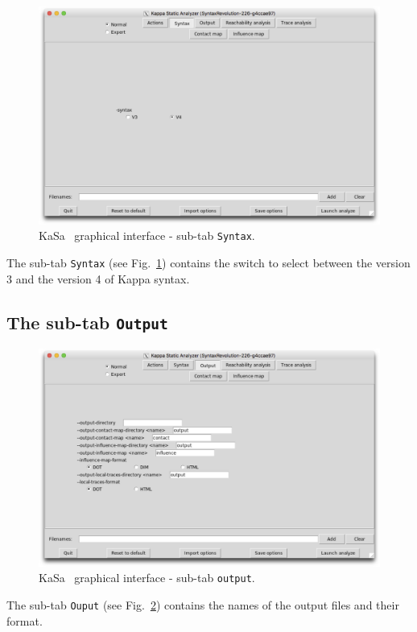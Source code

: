 \documentclass[11pt]{book}
\def\KaSa{\textsf{KaSa}}
\begin{document}
\begin{figure}[htbp]
  \centering
\includegraphics[width=12cm,bb=0 0 1904 1208]{img/kasa_1.png}
\caption{\KaSa~ graphical interface - sub-tab \texttt{Syntax}.}
\label{fig:kasa:01}
\end{figure}

The sub-tab \texttt{Syntax} (see Fig.~\ref{fig:kasa:01}) contains the switch to select between the version 3 and the version 4 of Kappa syntax.

\subsection{The sub-tab \texttt{Output}}

\begin{figure}[htbp]
\centering
\includegraphics[width=12cm]{img/kasa_2.png}
\caption{\KaSa~ graphical interface - sub-tab \texttt{output}.}
\label{fig:kasa:1}
\end{figure}


The sub-tab \texttt{Ouput} (see Fig.~\ref{fig:kasa:1}) contains the names of the output files and their format.
\end{document}
